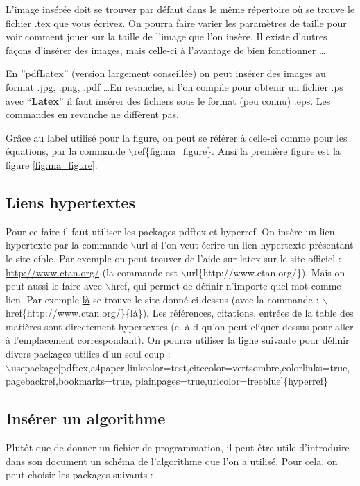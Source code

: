 \documentclass[11pt]{article}
\theoremstyle{remark}
\theoremstyle{definition}
\begin{document}
L'image insérée doit se trouver par défaut dans le même répertoire où se trouve le fichier .tex que vous écrivez. On pourra faire varier les paramètres de taille pour voir comment jouer sur la taille de l'image que l'on insère. Il existe d'autres façons d'insérer des images, mais celle-ci à l'avantage de bien fonctionner \ldots \medskip


En ''pdfLatex'' (version largement conseillée)  on peut insérer des images au format .jpg, .png, .pdf \ldots En revanche, si l'on compile pour obtenir un fichier .ps avec ``\textbf{Latex}'' il faut insérer des fichiers sous le format (peu connu) .eps. Les commandes en revanche ne diffèrent pas.\medskip

Grâce au label utilisé pour la figure, on peut se référer  à celle-ci comme pour les équations, par la commande $\backslash$ref\{fig:ma\_figure\}. Ansi la première figure est la figure \ref{fig:ma_figure}.

\subsection{Liens hypertextes}

Pour ce faire il faut utiliser les packages pdftex et hyperref.
On insère un lien hypertexte par la commande $\backslash$url si l'on veut écrire un lien hypertexte présentant le site cible. Par exemple on peut trouver de l'aide sur latex sur le site officiel : \url{http://www.ctan.org/} (la commande est $\backslash $url\{http://www.ctan.org/\}). Mais on peut aussi le faire avec $\backslash$href, qui permet de définir n'importe quel mot comme lien. Par exemple \href{http://www.ctan.org/}{là} se trouve le site donné ci-dessus (avec la commande : $\backslash$href\{http://www.ctan.org/\}\{là\}).  Les références, citations, entrées de la table des matières sont directement hypertextes (c.-à-d qu'on peut cliquer dessus pour aller à l'emplacement correspondant).
On pourra utiliser la ligne suivante pour définir divers packages utilies  d'un seul coup :\\
$\backslash$usepackage[pdftex,a4paper,linkcolor=test,citecolor=vertsombre,colorlinks=true,\\pagebackref,bookmarks=true, plainpages=true,urlcolor=freeblue]\{hyperref\}


\subsection{Insérer un algorithme}
Plutôt que de donner un fichier de programmation, il peut être utile d'introduire dans son document un schéma de l'algorithme que l'on a utilisé. Pour cela, on peut choisir les packages suivants :\medskip
\end{document}
